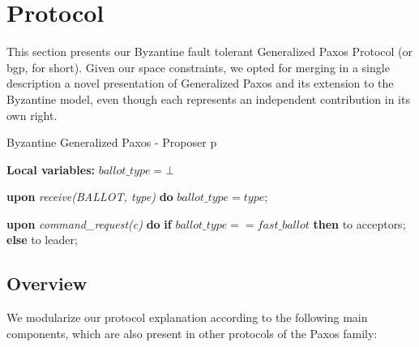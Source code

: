 \section{Protocol}

This section presents our Byzantine fault tolerant Generalized Paxos
Protocol (or \acrshort{bgp}, for short). Given our space constraints, we opted
for merging in a single description a novel presentation of
Generalized Paxos and its extension to the Byzantine model, even though
each represents an independent contribution in its own right.


\begin{algorithm}
	\caption{Byzantine Generalized Paxos - Proposer p}
	\label{BFT-Prop}
	\textbf{Local variables:} $ballot\_type = \bot$
	\begin{algorithmic}[1]	
		
		\State \textbf{upon} \textit{receive(BALLOT, type)} \textbf{do} 
		\State \hspace{\algorithmicindent} $ballot\_type = type$;
		\State
		
		\State \textbf{upon} \textit{command\_request(c)} \textbf{do}   \hspace{\algorithmicindent}\hspace{\algorithmicindent}\hspace{\algorithmicindent}\hspace{\algorithmicindent}
		\State \hspace{\algorithmicindent} \textbf{if} $ballot\_type == fast\_ballot$ \textbf{then}
		\State \hspace{\algorithmicindent}\hspace{\algorithmicindent}  to acceptors;
		\State \hspace{\algorithmicindent} \textbf{else} 
		\State \hspace{\algorithmicindent}\hspace{\algorithmicindent}  to leader;		
	\end{algorithmic}
\end{algorithm}

\subsection{Overview}
We modularize our protocol explanation according to the following main components, which are also present in other protocols of the Paxos family:

